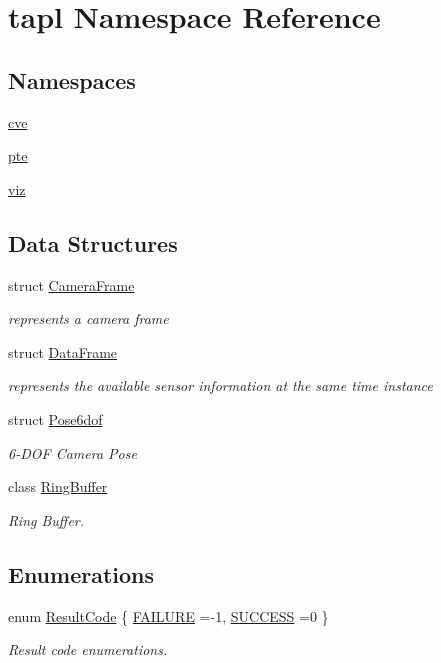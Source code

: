 \hypertarget{namespacetapl}{}\section{tapl Namespace Reference}
\label{namespacetapl}
\subsection*{Namespaces}
\begin{DoxyCompactItemize}
\item 
 \hyperlink{namespacetapl_1_1cve}{cve}
\item 
 \hyperlink{namespacetapl_1_1pte}{pte}
\item 
 \hyperlink{namespacetapl_1_1viz}{viz}
\end{DoxyCompactItemize}
\subsection*{Data Structures}
\begin{DoxyCompactItemize}
\item 
struct \hyperlink{structtapl_1_1CameraFrame}{Camera\+Frame}
\begin{DoxyCompactList}\small\item\em represents a camera frame \end{DoxyCompactList}\item 
struct \hyperlink{structtapl_1_1DataFrame}{Data\+Frame}
\begin{DoxyCompactList}\small\item\em represents the available sensor information at the same time instance \end{DoxyCompactList}\item 
struct \hyperlink{structtapl_1_1Pose6dof}{Pose6dof}
\begin{DoxyCompactList}\small\item\em 6-\/\+D\+OF Camera Pose \end{DoxyCompactList}\item 
class \hyperlink{classtapl_1_1RingBuffer}{Ring\+Buffer}
\begin{DoxyCompactList}\small\item\em Ring Buffer. \end{DoxyCompactList}\end{DoxyCompactItemize}
\subsection*{Enumerations}
\begin{DoxyCompactItemize}
\item 
enum \hyperlink{namespacetapl_a196ce1d5bf399fc26f03797e6a8d03ff}{Result\+Code} \{ \hyperlink{namespacetapl_a196ce1d5bf399fc26f03797e6a8d03ffaa6e243674a964518a62bdda7f20f6453}{F\+A\+I\+L\+U\+RE} =-\/1, 
\hyperlink{namespacetapl_a196ce1d5bf399fc26f03797e6a8d03ffafbdd78b1e8654e11461f37fea68c6195}{S\+U\+C\+C\+E\+SS} =0
 \}\begin{DoxyCompactList}\small\item\em Result code enumerations. \end{DoxyCompactList}
\end{DoxyCompactItemize}



